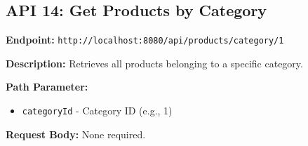 \documentclass[12pt, a4paper]{article}
\begin{document}
\vspace{0.5cm}

\subsection{API 14: Get Products by Category}

\begin{tcolorbox}[colback=getcolor!10, colframe=getcolor, title=GET]
\textbf{Endpoint:} \texttt{http://localhost:8080/api/products/category/1}
\end{tcolorbox}

\textbf{Description:} Retrieves all products belonging to a specific category.

\textbf{Path Parameter:}
\begin{itemize}
    \item \texttt{categoryId} - Category ID (e.g., 1)
\end{itemize}

\textbf{Request Body:} None required.
\end{document}
